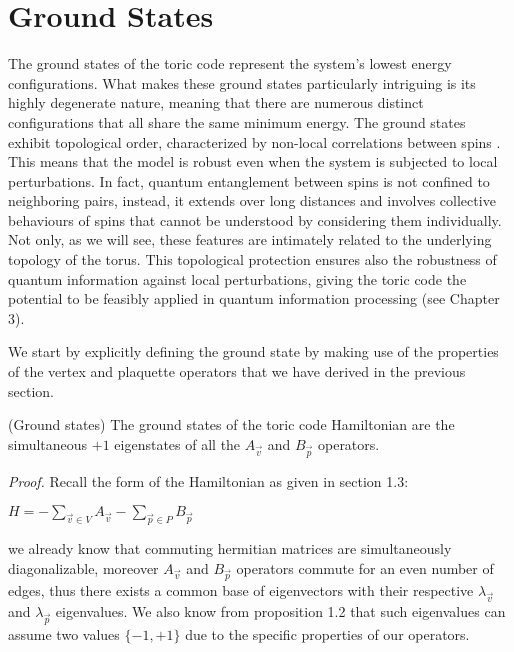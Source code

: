 \documentclass{Configuration_Files/PoliMi3i_thesis}
\begin{document}
\newpage
\section{Ground States}
\label{sec:GS}

The ground states of the toric code represent the system's lowest energy configurations. What makes these ground states particularly intriguing is its highly degenerate nature, meaning that there are numerous distinct configurations that all share the same minimum energy. 
The ground states exhibit topological order, characterized by non-local correlations between spins \cite{Kit02}. This means that the model is robust  even when the system is subjected to local perturbations.  In fact, quantum entanglement between spins is not confined to neighboring pairs, instead, it extends over long distances and involves collective behaviours of spins that cannot be understood by considering them individually.
Not only, as we will see, these features are intimately related to the underlying topology of the torus. This topological protection ensures also the robustness of quantum information against local perturbations, giving the toric code the potential to be feasibly applied in quantum information processing (see Chapter 3).\newline

We start by explicitly defining the ground state by making use of the properties of the vertex and plaquette operators that we have derived in the previous section.

\begin{proposition} (Ground states) The ground states of the toric code Hamiltonian are the simultaneous $+1$ eigenstates of all the $A_{\vec{v}}$ and $B_{\vec{p}}$ operators. 
\end{proposition}

\textit{Proof.}\newline 
Recall the form of the Hamiltonian as given in section 1.3:

\begin{center}
	
	$H = -\sum_{\vec{v} \in V}
	A_{\vec{v}} - \sum_{\vec{p} \in P} B_{\vec{p}} $
	
\end{center}

we already know that commuting hermitian matrices are simultaneously diagonalizable, moreover $A_{\vec{v}} $ and $B_{\vec{p}} $ operators commute for an even number of edges, thus there exists a common base of eigenvectors with their respective $\lambda_{\vec{v}}$ and $\lambda_{\vec{p}}$ eigenvalues. We also know from proposition 1.2 that such eigenvalues can assume two values $\{-1,+1\}$ due to the specific properties of our operators.
\end{document}
